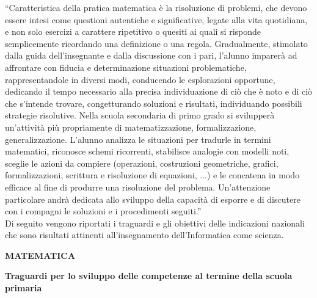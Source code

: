 \documentclass[12pt]{report}
\begin{document}
“Caratteristica della pratica matematica è la risoluzione di problemi, che devono essere intesi come questioni autentiche e significative, legate alla vita quotidiana, e non solo esercizi a carattere ripetitivo o quesiti ai quali si risponde semplicemente ricordando una definizione o una regola. Gradualmente, stimolato dalla guida dell'insegnante e dalla discussione con i pari, l’alunno imparerà ad affrontare con fiducia e determinazione situazioni problematiche, rappresentandole in diversi modi, conducendo le esplorazioni opportune, dedicando il tempo necessario alla precisa individuazione di ciò che è noto e di ciò che s’intende trovare, congetturando soluzioni e risultati, individuando possibili strategie risolutive. Nella scuola secondaria di primo grado si svilupperà un’attività più propriamente di matematizzazione, formalizzazione, generalizzazione. L’alunno analizza le situazioni per tradurle in termini matematici, riconosce schemi ricorrenti, stabilisce analogie con modelli noti, sceglie le azioni da compiere (operazioni, costruzioni geometriche, grafici, formalizzazioni, scrittura e risoluzione di equazioni, ...) e le concatena in modo efficace al fine di produrre una risoluzione del problema. Un’attenzione particolare andrà dedicata allo sviluppo della capacità di esporre e di discutere con i compagni le soluzioni e i procedimenti seguiti.”
\\

Di seguito vengono riportati i traguardi e gli obiettivi delle indicazioni nazionali che sono risultati attinenti all'insegnamento dell'Informatica come scienza.

\bigskip
\noindent \textbf{MATEMATICA}


\medskip
\noindent \textbf{Traguardi per lo sviluppo delle competenze al termine della scuola primaria}
\end{document}
